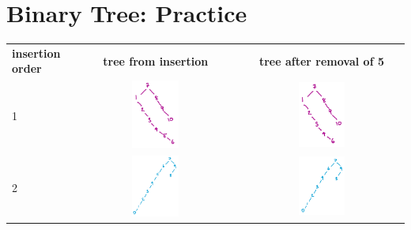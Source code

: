 \documentclass[twoside=false,DIV=14]{scrartcl}
\begin{document}
\section{Binary Tree: Practice}
\begin{tabular}[t]{lcc}
\textbf{insertion order} &  \textbf{tree from insertion} & \textbf{tree after removal of 5} \\
1 & \includegraphics[width=0.3\textwidth]{3_1.jpeg} & \includegraphics[width=0.3\textwidth]{3_1_removed.jpeg} \\
2 & \includegraphics[width=0.3\textwidth]{3_2.jpeg} & \includegraphics[width=0.3\textwidth]{3_2_removed.jpeg} \\
\end{tabular}
\end{document}
